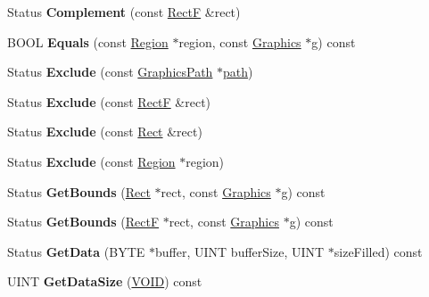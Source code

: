 \begin{DoxyCompactItemize}
Status {\bfseries Complement} (const \hyperlink{struct_rect_f}{RectF} \&rect)
\item 
\mbox{\label{class_region_aade0e719bacf6020dd577b311c8e1182}} 
B\+O\+OL {\bfseries Equals} (const \hyperlink{class_region}{Region} $\ast$region, const \hyperlink{class_graphics}{Graphics} $\ast$g) const
\item 
\mbox{\label{class_region_a0fc8e85cba3dd951bc8e2d417648dba9}} 
Status {\bfseries Exclude} (const \hyperlink{class_graphics_path}{Graphics\+Path} $\ast$\hyperlink{structpath}{path})
\item 
\mbox{\label{class_region_a7283413f71d20d7390ea3920f9ca2a29}} 
Status {\bfseries Exclude} (const \hyperlink{struct_rect_f}{RectF} \&rect)
\item 
\mbox{\label{class_region_a432125d8f9b1467e3431629b90c046a8}} 
Status {\bfseries Exclude} (const \hyperlink{struct_rect}{Rect} \&rect)
\item 
\mbox{\label{class_region_ae6252cf3b9ece81b62f8a508cd61bf29}} 
Status {\bfseries Exclude} (const \hyperlink{class_region}{Region} $\ast$region)
\item 
\mbox{\label{class_region_a24837ebbf645a83c766fd912b0933d4f}} 
Status {\bfseries Get\+Bounds} (\hyperlink{struct_rect}{Rect} $\ast$rect, const \hyperlink{class_graphics}{Graphics} $\ast$g) const
\item 
\mbox{\label{class_region_a1adbd0869774f075df869b06bc1b1ecd}} 
Status {\bfseries Get\+Bounds} (\hyperlink{struct_rect_f}{RectF} $\ast$rect, const \hyperlink{class_graphics}{Graphics} $\ast$g) const
\item 
\mbox{\label{class_region_af2c940792484b76980a5ee3c0b33f4a0}} 
Status {\bfseries Get\+Data} (B\+Y\+TE $\ast$buffer, U\+I\+NT buffer\+Size, U\+I\+NT $\ast$size\+Filled) const
\item 
\mbox{\label{class_region_ac75ace12c611d2dc09811a8c423e6fa5}} 
U\+I\+NT {\bfseries Get\+Data\+Size} (\hyperlink{interfacevoid}{V\+O\+ID}) const
\item 

\end{DoxyCompactItemize}
